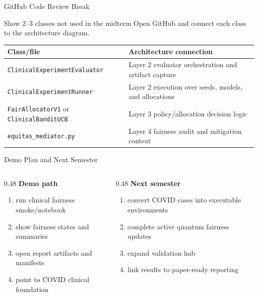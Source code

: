 \begin{frame}{GitHub Code Review Break}
\begin{block}{Show 2--3 classes not used in the midterm}
Open GitHub and connect each class to the architecture diagram.
\end{block}
\small
\begin{center}
\begin{tabular}{p{}p{}}
\toprule
Class/file & Architecture connection \\
\midrule
\texttt{ClinicalExperimentEvaluator} & Layer 2 evaluator orchestration and artifact capture \\
\texttt{ClinicalExperimentRunner} & Layer 2 execution over seeds, models, and allocations \\
\texttt{FairAllocatorV1} or \texttt{ClinicalBanditUCB} & Layer 3 policy/allocation decision logic \\
\texttt{equitas\_mediator.py} & Layer 4 fairness audit and mitigation context \\
\bottomrule
\end{tabular}
\end{center}
\end{frame}

\begin{frame}{Demo Plan and Next Semester}
\begin{columns}[T]
\begin{column}{0.48\textwidth}
\textbf{Demo path}
\begin{enumerate}
\item run clinical fairness smoke/notebook
\item show fairness states and summaries
\item open report artifacts and manifests
\item point to COVID clinical foundation
\end{enumerate}
\end{column}
\begin{column}{0.48\textwidth}
\textbf{Next semester}
\begin{enumerate}
\item convert COVID cases into executable environments
\item complete active quantum fairness updates
\item expand validation hub
\item link results to paper-ready reporting
\end{enumerate}
\end{column}
\end{columns}
\end{frame}

